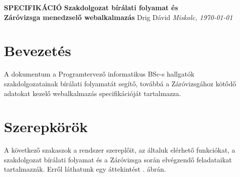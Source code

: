 \documentclass[a4paper,12pt]{article}
\begin{document}
\begin{center}
	{\huge
		\textbf{SPECIFIKÁCIÓ}
		\vskip 3cm
		\textbf{Szakdolgozat bírálati folyamat és \\ Záróvizsga menedzselő webalkalmazás}
		\vskip 1cm
		Drig Dávid		
	}
	\vskip 12cm
	{\large
		\textit{Miskolc, \today}
	}
\end{center}

\pagestyle{empty}

\newpage

\tableofcontents

\newpage

\pagestyle{plain}

\setcounter{page}{1}

\section{Bevezetés}

A dokumentum a Programtervező informatikus BSc-s hallgatók szakdolgozatainak bírálati folyamatát segítő, továbbá a Záróvizsgához kötődő adatokat kezelő webalkalmazás specifikációját tartalmazza.

\section{Szerepkörök}

A következő szakaszok a rendszer szereplőit, az általuk elérhető funkciókat, a szakdolgozat bírálati folyamat és a Záróvizsga során elvégzendő feladataikat tartalmazzák. Erről láthatunk egy áttekintést . ábrán.
\end{document}
